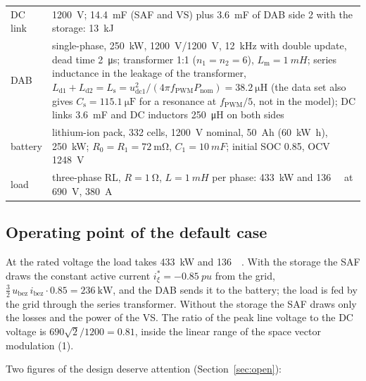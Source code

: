 \documentclass[11pt,a4paper]{scrartcl}
\newcommand{\ped}[1]{_{\mathrm{#1}}}
\begin{document}
\begin{onehalfspace}
\begin{table}[H]
\begin{tabularx}{0.97\textwidth}{@{} >{\raggedright\arraybackslash}p{} X @{}}
		DC link & \SI{1200}{V}; \SI{14.4}{mF} (SAF and VS) plus \SI{3.6}{mF} of DAB side 2 with the storage: \SI{13}{\kilo\joule} \\
		DAB & single-phase, \SI{250}{\kilo\watt}, \SI{1200}{V}/\SI{1200}{V}, \SI{12}{kHz} with double update, dead time \SI{2}{\micro\second}; transformer 1:1 ($n_1 = n_2 = 6$), $L\ped{m} = \SI{1}{mH}$; series inductance in the leakage of the transformer, $L\ped{d1} + L\ped{d2} = L\ped{s} = u\ped{dc1}^2/(4\pi f\ped{PWM} P\ped{nom}) = \SI{38.2}{\micro\henry}$ (the data set also gives $C\ped{s} = \SI{115.1}{\micro\farad}$ for a resonance at $f\ped{PWM}/5$, not in the model); DC links \SI{3.6}{mF} and DC inductors \SI{250}{\micro\henry} on both sides \\
		battery & lithium-ion pack, 332 cells, \SI{1200}{V} nominal, \SI{50}{Ah} (\SI{60}{\kilo\watt\hour}), \SI{250}{\kilo\watt}; $R_0 = R_1 = \SI{72}{\milli\ohm}$, $C_1 = \SI{10}{mF}$; initial SOC 0.85, OCV \SI{1248}{V} \\
		load & three-phase RL, $R = \SI{1}{\ohm}$, $L = \SI{1}{mH}$ per phase: \SI{433}{\kilo\watt} and \SI{136}{\kilo\var} at \SI{690}{V}, \SI{380}{A} \\
		\bottomrule
	\end{tabularx}
\end{table}

\subsection{Operating point of the default case}
\label{sec:oppoint}

At the rated voltage the load takes \SI{433}{\kilo\watt} and \SI{136}{\kilo\var}. With the storage the SAF draws the constant active current $i_\xi^* = \SI{-0.85}{pu}$ from the grid, $\tfrac{3}{2}\,u\ped{bez}\,i\ped{bez} \cdot 0.85 = \SI{236}{\kilo\watt}$, and the DAB sends it to the battery; the load is fed by the grid through the series transformer. Without the storage the SAF draws only the losses and the power of the VS. The ratio of the peak line voltage to the DC voltage is $690\sqrt{2}/1200 = 0.81$, inside the linear range of the space vector modulation (1).

Two figures of the design deserve attention (Section~\ref{sec:open}):


\end{onehalfspace}
\end{document}
